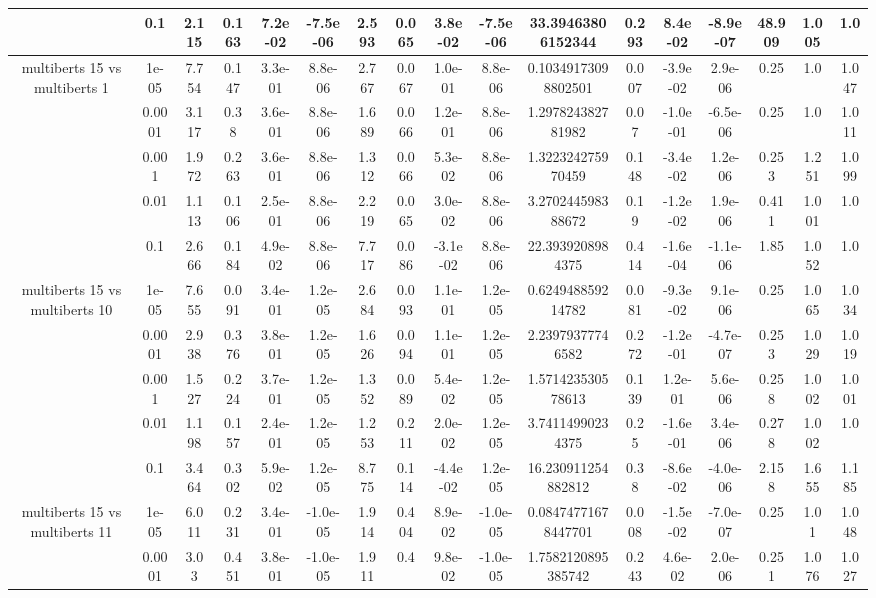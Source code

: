 \begin{tabular}{|c|c|c|c|c|c|c|c|c|c|c|c|c|c|c|c|c|}
 & 0.1 & 2.115 & 0.163 & 7.2e-02 & -7.5e-06 & 2.593 & 0.065 & 3.8e-02 & -7.5e-06 & 33.39463806152344 & 0.293 & 8.4e-02 & -8.9e-07 & 48.909 & 1.005 & 1.0 \\
\hline
\multirow{5}{*}{multiberts 15 vs multiberts 1} & 1e-05 & 7.754 & 0.147 & 3.3e-01 & 8.8e-06 & 2.767 & 0.067 & 1.0e-01 & 8.8e-06 & 0.10349173098802501 & 0.007 & -3.9e-02 & 2.9e-06 & 0.25 & 1.0 & 1.047 \\
 & 0.0001 & 3.117 & 0.38 & 3.6e-01 & 8.8e-06 & 1.689 & 0.066 & 1.2e-01 & 8.8e-06 & 1.297824382781982 & 0.07 & -1.0e-01 & -6.5e-06 & 0.25 & 1.0 & 1.011 \\
 & 0.001 & 1.972 & 0.263 & 3.6e-01 & 8.8e-06 & 1.312 & 0.066 & 5.3e-02 & 8.8e-06 & 1.322324275970459 & 0.148 & -3.4e-02 & 1.2e-06 & 0.253 & 1.251 & 1.099 \\
 & 0.01 & 1.113 & 0.106 & 2.5e-01 & 8.8e-06 & 2.219 & 0.065 & 3.0e-02 & 8.8e-06 & 3.270244598388672 & 0.19 & -1.2e-02 & 1.9e-06 & 0.411 & 1.001 & 1.0 \\
 & 0.1 & 2.666 & 0.184 & 4.9e-02 & 8.8e-06 & 7.717 & 0.086 & -3.1e-02 & 8.8e-06 & 22.3939208984375 & 0.414 & -1.6e-04 & -1.1e-06 & 1.85 & 1.052 & 1.0 \\
\hline
\multirow{5}{*}{multiberts 15 vs multiberts 10} & 1e-05 & 7.655 & 0.091 & 3.4e-01 & 1.2e-05 & 2.684 & 0.093 & 1.1e-01 & 1.2e-05 & 0.624948859214782 & 0.081 & -9.3e-02 & 9.1e-06 & 0.25 & 1.065 & 1.034 \\
 & 0.0001 & 2.938 & 0.376 & 3.8e-01 & 1.2e-05 & 1.626 & 0.094 & 1.1e-01 & 1.2e-05 & 2.23979377746582 & 0.272 & -1.2e-01 & -4.7e-07 & 0.253 & 1.029 & 1.019 \\
 & 0.001 & 1.527 & 0.224 & 3.7e-01 & 1.2e-05 & 1.352 & 0.089 & 5.4e-02 & 1.2e-05 & 1.571423530578613 & 0.139 & 1.2e-01 & 5.6e-06 & 0.258 & 1.002 & 1.001 \\
 & 0.01 & 1.198 & 0.157 & 2.4e-01 & 1.2e-05 & 1.253 & 0.211 & 2.0e-02 & 1.2e-05 & 3.74114990234375 & 0.25 & -1.6e-01 & 3.4e-06 & 0.278 & 1.002 & 1.0 \\
 & 0.1 & 3.464 & 0.302 & 5.9e-02 & 1.2e-05 & 8.775 & 0.114 & -4.4e-02 & 1.2e-05 & 16.230911254882812 & 0.38 & -8.6e-02 & -4.0e-06 & 2.158 & 1.655 & 1.185 \\
\hline
\multirow{5}{*}{multiberts 15 vs multiberts 11} & 1e-05 & 6.011 & 0.231 & 3.4e-01 & -1.0e-05 & 1.914 & 0.404 & 8.9e-02 & -1.0e-05 & 0.08474771678447701 & 0.008 & -1.5e-02 & -7.0e-07 & 0.25 & 1.01 & 1.048 \\
 & 0.0001 & 3.03 & 0.451 & 3.8e-01 & -1.0e-05 & 1.911 & 0.4 & 9.8e-02 & -1.0e-05 & 1.7582120895385742 & 0.243 & 4.6e-02 & 2.0e-06 & 0.251 & 1.076 & 1.027 \\

\end{tabular}

